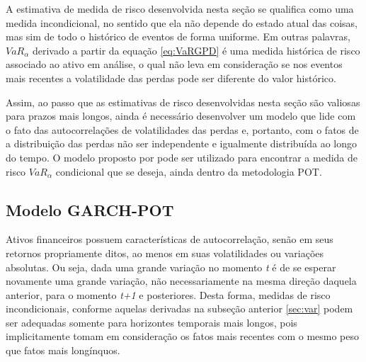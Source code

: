 \documentclass[1p]{elsarticle}
\theoremstyle{definition}
\begin{document}
A estimativa de medida de risco desenvolvida nesta seção se qualifica como uma medida incondicional, no sentido que ela não depende do estado atual das coisas, mas sim de todo o histórico de eventos de forma uniforme. Em outras palavras, $VaR_\alpha$ derivado a partir da equação \eqref{eq:VaRGPD} é uma medida histórica de risco associado ao ativo em análise, o qual não leva em consideração se nos eventos mais recentes a volatilidade das perdas pode ser diferente do valor histórico.


Assim, ao passo que as estimativas de risco desenvolvidas nesta seção são valiosas para prazos mais longos, ainda é necessário desenvolver um modelo que lide com o fato das autocorrelações de volatilidades das perdas e, portanto, com o fatos de a distribuição das perdas não ser independente e igualmente distribuída ao longo do tempo. O modelo proposto por \cite{McNeil2000} pode ser utilizado para encontrar a medida de risco $VaR_\alpha$ condicional que se deseja, ainda dentro da metodologia POT.

\subsection{Modelo GARCH-POT}
\label{sec:egarchpot}

Ativos financeiros possuem características de autocorrelação, senão em seus retornos propriamente ditos, ao menos em suas volatilidades ou variações absolutas. Ou seja, dada uma grande variação no momento \emph{t} é de se esperar novamente uma grande variação, não necessariamente na mesma direção daquela anterior, para o momento \emph{t+1} e posteriores. Desta forma, medidas de risco incondicionais, conforme aquelas derivadas na subseção anterior \ref{sec:var} podem ser adequadas somente para horizontes temporais mais longos, pois implicitamente tomam em consideração os fatos mais recentes com o mesmo peso que fatos mais longínquos.
\end{document}

